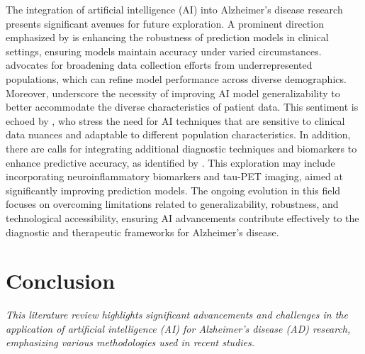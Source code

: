 \documentclass{MITcsail}
\begin{document}
The integration of artificial intelligence (AI) into Alzheimer's disease research presents significant avenues for future exploration. A prominent direction emphasized by \citet{ref_10_1016_j_neuroimage_2020_117203} is enhancing the robustness of prediction models in clinical settings, ensuring models maintain accuracy under varied circumstances. \citet{ref_10_1002_alz_13390} advocates for broadening data collection efforts from underrepresented populations, which can refine model performance across diverse demographics. Moreover, \citet{ref_10_1016_s2589_7500_22_00169_8} underscore the necessity of improving AI model generalizability to better accommodate the diverse characteristics of patient data. This sentiment is echoed by \citet{ref_10_1016_j_ejrad_2023_110934}, who stress the need for AI techniques that are sensitive to clinical data nuances and adaptable to different population characteristics. In addition, there are calls for integrating additional diagnostic techniques and biomarkers to enhance predictive accuracy, as identified by \citet{ref_10_1002_alz_12032}. This exploration may include incorporating neuroinflammatory biomarkers and tau-PET imaging, aimed at significantly improving prediction models. The ongoing evolution in this field focuses on overcoming limitations related to generalizability, robustness, and technological accessibility, ensuring AI advancements contribute effectively to the diagnostic and therapeutic frameworks for Alzheimer's disease.

\section{Conclusion}

\textit{This literature review highlights significant advancements and challenges in the application of artificial intelligence (AI) for Alzheimer's disease (AD) research, emphasizing various methodologies used in recent studies.}
\end{document}
